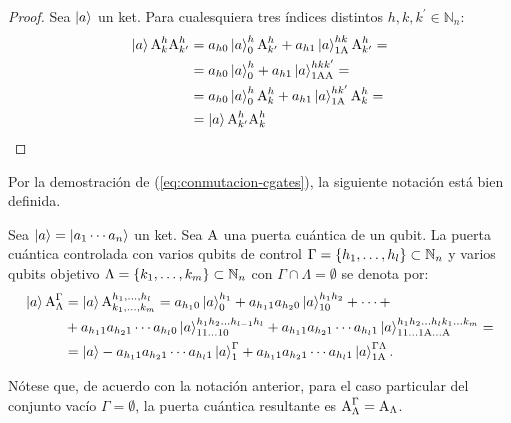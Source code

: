 \begin{proof}
	Sea $\ket{a}$ un ket. Para cualesquiera tres índices distintos $h,k,k^\prime \in \mathbb{N}_n$:
	\begin{equation}
		\label{eq:conmutacion-cgates}
		\begin{split}
			\ket{a}\text{A}^{h}_{k}\text{A}^{h}_{k^\prime}
			&=a_{h0}\ket{a}^{h}_{0}\text{A}^{h}_{k^\prime}+a_{h1}\ket{a}^{hk}_{1\text{A}}\text{A}^{h}_{k^\prime}=\\
			&=a_{h0}\ket{a}^{h}_{0}+a_{h1}\ket{a}^{hkk^\prime}_{1\text{AA}}=\\
			&=a_{h0}\ket{a}^{h}_{0}\text{A}^{h}_{k}+a_{h1}\ket{a}^{hk^\prime}_{1\text{A}}\text{A}^{h}_{k}=\\
			&=\ket{a}\text{A}^{h}_{k^\prime}\text{A}^{h}_{k}
		\end{split}
	\end{equation}
\end{proof}

Por la demostración de (\ref{eq:conmutacion-cgates}), la siguiente notación está bien definida.
\begin{notation}
	Sea $\ket{a}=\ket{a_1\cdots a_n}$ un ket.
	Sea $\text{A}$ una puerta cuántica de un qubit.
	La puerta cuántica controlada con varios qubits de control $\Gamma=\{h_1,\dots,h_l\}\subset\mathbb{N}_n$ y varios qubits objetivo $\Lambda=\{k_1,\dots,k_m\}\subset\mathbb{N}_n$ con $\Gamma\cap\Lambda=\emptyset$ se denota por:
	\begin{align*}
	\ket{a}\text{A}^{\Gamma}_{\Lambda}&=\ket{a}\text{A}^{h_1,\dots,h_l}_{k_1,\dots, k_m}=a_{h_{1}0}\ket{a}^{h_1}_{0}+a_{h_{1}1}a_{h_{2}0}\ket{a}^{h_{1}h_{2}}_{10}+\dots+\\
	&+a_{h_{1}1}a_{h_{2}1}\cdots a_{h_{l}0}\ket{a}^{h_{1}h_{2}\dots h_{l-1}h_{l}}_{11\dots 10}+
	a_{h_{1}1}a_{h_{2}1}\cdots a_{h_{l}1}\ket{a}^{h_{1}h_{2}\dots h_{l}k_1\dots k_m}_{11\dots 1\text{A}\dots \text{A}}=\\
	&=\ket{a}-a_{h_{1}1}a_{h_{2}1}\cdots a_{h_{l}1}\ket{a}^{\Gamma}_{1}+a_{h_{1}1}a_{h_{2}1}\cdots a_{h_{l}1}\ket{a}^{\Gamma\Lambda}_{1\text{A}}.
	\end{align*}
\end{notation}
Nótese que, de acuerdo con la notación anterior, para el caso particular del conjunto vacío $\Gamma=\emptyset$, la puerta cuántica resultante es $\text{A}^{\Gamma}_{\Lambda}=\text{A}_{\Lambda}$.
